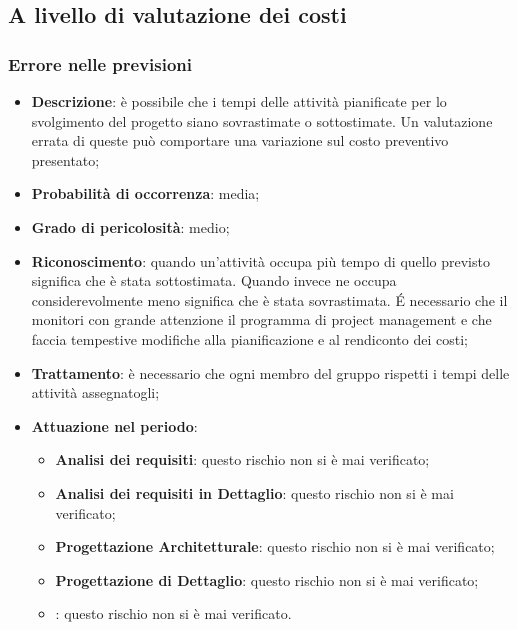 	\subsection{A livello di valutazione dei costi}
	
		\subsubsection{Errore nelle previsioni}
		\begin{itemize} 
			\item \textbf{Descrizione}: è possibile che i tempi delle attività pianificate per lo svolgimento del progetto siano sovrastimate o sottostimate. Un valutazione errata di queste può comportare una variazione sul costo preventivo presentato;
			\item \textbf{Probabilità di occorrenza}: media;
			\item \textbf{Grado di pericolosità}: medio;
			\item \textbf{Riconoscimento}: quando un'attività occupa più tempo di quello previsto significa che è stata sottostimata. Quando invece ne occupa considerevolmente meno significa che è stata sovrastimata. \'E necessario che il \textit{\Res} monitori con grande attenzione il programma di project management e che faccia tempestive modifiche alla pianificazione e al rendiconto dei costi;
			\item \textbf{Trattamento}: è necessario che ogni membro del gruppo rispetti i tempi delle attività assegnatogli;
			\item \textbf{Attuazione nel periodo}:
			\begin{itemize}
				\item \textbf{Analisi dei requisiti}: questo rischio non si è mai verificato;
				\item \textbf{Analisi dei requisiti in Dettaglio}: questo rischio non si è mai verificato;
				\item \textbf{Progettazione Architetturale}: questo rischio non si è mai verificato;
				\item \textbf{Progettazione di Dettaglio}: questo rischio non si è mai verificato;
				\item \textbf{\CO}: questo rischio non si è mai verificato. 
			\end{itemize}
		\end{itemize}